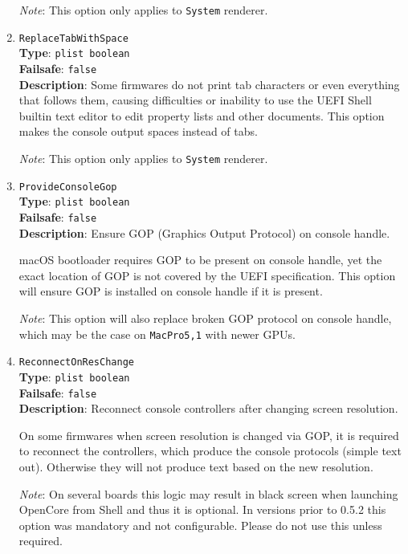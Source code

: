 \documentclass[]{article}
\begin{document}
\begin{enumerate}
  \emph{Note}: This option only applies to \texttt{System} renderer.

\item
  \texttt{ReplaceTabWithSpace}\\
  \textbf{Type}: \texttt{plist\ boolean}\\
  \textbf{Failsafe}: \texttt{false}\\
  \textbf{Description}: Some firmwares do not print tab characters or even everything
  that follows them, causing difficulties or inability to use the UEFI Shell builtin
  text editor to edit property lists and other documents. This option makes the console
  output spaces instead of tabs.

  \emph{Note}: This option only applies to \texttt{System} renderer.

\item
  \texttt{ProvideConsoleGop}\\
  \textbf{Type}: \texttt{plist\ boolean}\\
  \textbf{Failsafe}: \texttt{false}\\
  \textbf{Description}: Ensure GOP (Graphics Output Protocol) on console handle.

  macOS bootloader requires GOP to be present on console handle, yet the exact
  location of GOP is not covered by the UEFI specification. This option will
  ensure GOP is installed on console handle if it is present.

  \emph{Note}: This option will also replace broken GOP protocol on console handle,
  which may be the case on \texttt{MacPro5,1} with newer GPUs.

\item
  \texttt{ReconnectOnResChange}\\
  \textbf{Type}: \texttt{plist\ boolean}\\
  \textbf{Failsafe}: \texttt{false}\\
  \textbf{Description}: Reconnect console controllers after changing screen resolution.

  On some firmwares when screen resolution is changed via GOP, it is required to reconnect
  the controllers, which produce the console protocols (simple text out). Otherwise they
  will not produce text based on the new resolution.

  \emph{Note}: On several boards this logic may result in black screen when launching
  OpenCore from Shell and thus it is optional. In versions prior to 0.5.2 this option
  was mandatory and not configurable. Please do not use this unless required.


\end{enumerate}
\end{document}
